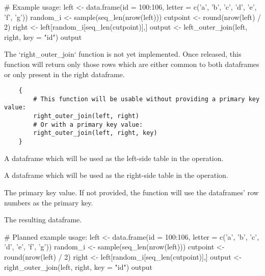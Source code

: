 \documentclass[a4paper]{book}
\begin{document}
%
\begin{Examples}
\begin{ExampleCode}
    # Example usage:
    left <- data.frame(id = 100:106, letter = c('a', 'b', 'c', 'd', 'e', 'f', 'g'))
    random_i <- sample(seq_len(nrow(left)))
    cutpoint <- round(nrow(left) / 2)
    right <- left[random_i[seq_len(cutpoint)],]
    output <- left_outer_join(left, right, key = "id")
    output
\end{ExampleCode}
\end{Examples}
%
\begin{Description}\relax
The `right\_outer\_join` function is not yet implemented.
Once released, this function will return only those rows which are either common to both dataframes or only present in the right dataframe.
\end{Description}
%
\begin{Usage}
\begin{verbatim}
    {
        # This function will be usable without providing a primary key value:
        right_outer_join(left, right)
        # Or with a primary key value:
        right_outer_join(left, right, key)
    }
\end{verbatim}
\end{Usage}
%
\begin{Arguments}
\begin{ldescription}
\item[\code{left}] A dataframe which will be used as the left-side table in the operation.
\item[\code{right}] A dataframe which will be used as the right-side table in the operation.
\item[\code{key}] The primary key value. If not provided, the function will use the dataframes' row numbers as the primary key.
\end{ldescription}
\end{Arguments}
%
\begin{Value}
\begin{ldescription}
\item[\code{rtn}] The resulting dataframe.
\end{ldescription}
\end{Value}
%
\begin{Examples}
\begin{ExampleCode}
    # Planned example usage:
    left <- data.frame(id = 100:106, letter = c('a', 'b', 'c', 'd', 'e', 'f', 'g'))
    random_i <- sample(seq_len(nrow(left)))
    cutpoint <- round(nrow(left) / 2)
    right <- left[random_i[seq_len(cutpoint)],]
    output <- right_outer_join(left, right, key = "id")
    output
\end{ExampleCode}
\end{Examples}
\end{document}
